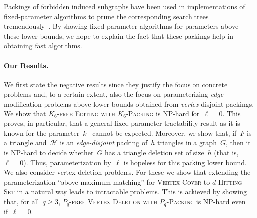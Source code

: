 \documentclass[envcountsame,numbook,smallextended]{svjour3}
\numberwithin{equation}{section}
\numberwithin{figure}{section}
\newcommand{\gfedv}[1]{\textsc{\ensuremath{#1}-free Editing with \ensuremath{#1}-Packing}}
\newcommand{\packing}{\ensuremath{\mathcal H}}
\newcommand{\PLVD}{\textsc{\ensuremath{P_q}-free Vertex Deletion with  \ensuremath{P_q}-Packing}}
\begin{document}
Packings of forbidden induced subgraphs have been used in implementations of fixed-parameter algorithms to prune the corresponding search trees tremendously~\cite{HH15}. By showing fixed-parameter algorithms for parameters above these lower bounds, we hope to explain the fact that these packings help in obtaining fast algorithms.


\paragraph{Our Results.}We first state the negative results since they
justify the focus on concrete problems and, to a certain extent, also
the focus on parameterizing \emph{edge} modification problems above
lower bounds obtained from
\emph{vertex}-disjoint packings. We show that \gfedv{K_6} is NP-hard
for~$\ell=0$. This proves, in particular, that a general
fixed-parameter tractability result as it is known for the
parameter~$k$~\cite{Cai96} cannot be expected. Moreover, we show that,
if~$F$ is a triangle and~$\packing$ is an \emph{edge-disjoint} packing
of~$h$ triangles in a graph~$G$, then it is NP-hard to decide
whether~$G$ has a triangle deletion set of size~$h$ (that is,
$\ell=0$). Thus, parameterization by~$\ell$ is hopeless for this
packing lower bound. We also consider vertex deletion problems. For
these we show that extending the parameterization ``above maximum
matching'' for \textsc{Vertex Cover} to \textsc{$d$-Hitting Set} in a
natural way leads to intractable problems. This is achieved by showing
that, for all~$q\ge 3$, \PLVD{} is NP-hard even if~$\ell=0$.
\end{document}

